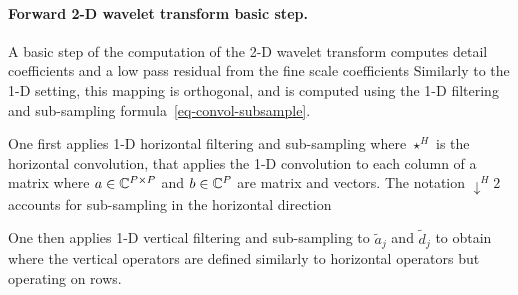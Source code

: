 \paragraph{Forward 2-D wavelet transform basic step.}

A basic step of the computation of the 2-D wavelet transform computes detail coefficients and a low pass residual from the fine scale coefficients
Similarly to the 1-D setting, this mapping is orthogonal, and is computed using the 1-D filtering and sub-sampling formula~\eqref{eq-convol-subsample}.

One first applies 1-D horizontal filtering and sub-sampling
where $\star^H$ is the horizontal convolution, that applies the 1-D convolution to each column of a matrix
where $a \in \mathbb{C}^{P \times P}$ and $b \in \mathbb{C}^P$ are matrix and vectors. The notation $\downarrow^H 2$ accounts for sub-sampling in the horizontal direction

One then applies 1-D vertical filtering and sub-sampling to $\tilde a_j$ and $\tilde d_j$ to obtain
where the vertical operators are defined similarly to horizontal operators but operating on rows.




